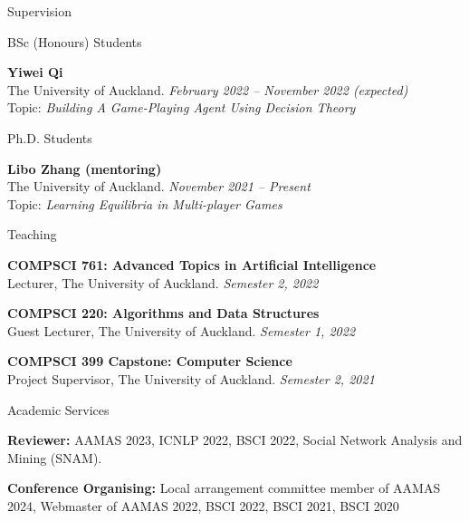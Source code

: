 \documentclass{resume} %
\begin{document}
\begin{rSection}{Supervision}
	\begin{rSubsection}{BSc (Honours) Students}{}{}{}
		\item {\bf Yiwei Qi}\\ The University of Auckland. \hfill {\em February 2022 -- November 2022 (expected)} \\Topic: {\em Building A Game-Playing Agent Using Decision Theory}
	\end{rSubsection}
	\begin{rSubsection}{Ph.D. Students}{}{}{}
		\item {\bf Libo Zhang (mentoring)}\\ The University of Auckland. \hfill {\em November 2021 -- Present} \\Topic: {\em Learning Equilibria in Multi-player Games}
	\end{rSubsection}
\end{rSection}

\begin{rSection}{Teaching}
	\begin{rSubsection}{}{}{}{}
	\item {\bf COMPSCI 761: Advanced Topics in Artificial Intelligence}\\ Lecturer, The University of Auckland. \hfill {\em Semester 2, 2022}
		\item {\bf COMPSCI 220: Algorithms and Data Structures}\\ Guest Lecturer, The University of Auckland. \hfill {\em Semester 1, 2022} 
		\item {\bf COMPSCI 399 Capstone: Computer Science}\\ Project Supervisor, The University of Auckland. \hfill {\em Semester 2, 2021}
	\end{rSubsection}
\end{rSection}

\begin{rSection}{Academic Services}
	\begin{rSubsection}{}{}{}{}
		\item {\bf Reviewer:} AAMAS 2023, ICNLP 2022, BSCI 2022, Social Network Analysis and Mining (SNAM).		
		\item {\bf Conference Organising:} Local arrangement committee member of AAMAS 2024, Webmaster of AAMAS 2022, BSCI 2022, BSCI 2021, BSCI 2020
	\end{rSubsection}
\end{rSection}
\end{document}
